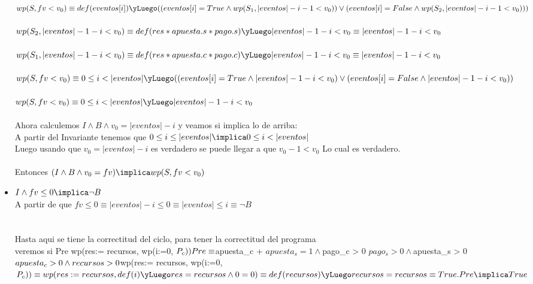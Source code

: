 \documentclass[10pt,a4paper]{article}
\begin{document}
\begin{itemize}
  $wp(S,fv<v_0)\equiv def(eventos[i])\yLuego ((eventos[i]=True \land wp(S_1, |eventos|-i-1<v_0))\lor (eventos[i]=False \land wp(S_2, |eventos|-i-1<v_0))) 
  $ \\
  \\
  $wp(S_2,|eventos|-1-i<v_0) \equiv def(res*apuesta.s*pago.s)\yLuego |eventos|-1-i<v_0 \equiv |eventos|-1-i<v_0
  $
  \\
  \\
  $wp(S_1,|eventos|-1-i<v_0) \equiv def(res*apuesta.c*pago.c)\yLuego |eventos|-1-i<v_0 \equiv |eventos|-1-i<v_0
  $\\
  \\
  $wp(S,fv<v_0)\equiv 0\leq i <|eventos|\yLuego ((eventos[i]=True\land |eventos|-1-i<v_0)\lor (eventos[i]=False\land |eventos|-1-i<v_0))
  $\\
  \\
  $wp(S,fv<v_0)\equiv 0\leq i <|eventos| \yLuego |eventos|-1-i<v_0 
  $\\
  \\
  Ahora calculemos $I \land B \land v_0 = |eventos| - i$ y veamos si implica lo de arriba: \\
  A partir del Invariante tenemos que $0\leq i \leq |eventos| \implica 0\leq i < |eventos| $ \\Luego usando que $v_0 =|eventos|-i $  es verdadero se puede llegar a que $v_0 - 1 < v_0$ Lo cual es verdadero.\\
  \\
  Entonces $(I \land B \land v_0 = fv) \implica wp(S, fv < v_0)$
  
  \item $I \land fv \leq 0 \implica \neg B$\\
  A partir de que $fv\leq 0 \equiv |eventos|-i \leq 0 \equiv |eventos|\leq i \equiv \neg B$\\
  \\
  \\
  Hasta aqui se tiene la correctitud del ciclo, para tener la correctitud del programa \\veremos si Pre \implica wp(res:= recursos, wp(i:=0, $P_c))

  \\Pre \equiv 
 $apuesta_c + $apuesta_s = 1 \land $pago_c > 0 \land $pago_s > 0 \land $apuesta_s > 0 \land $apuesta_c > 0 \land recursos > 0\\
 \\
$wp(res:= recursos, wp(i:=0, $P_c)) \equiv  wp(res:=recursos, def(i) \yLuego res = recursos \land 0 = 0) \equiv \\
def(recursos) \yLuego recursos = recursos \equiv True. \\
Pre \implica True 
 $
  \newpage
  
         
\end{itemize}
\end{document}
